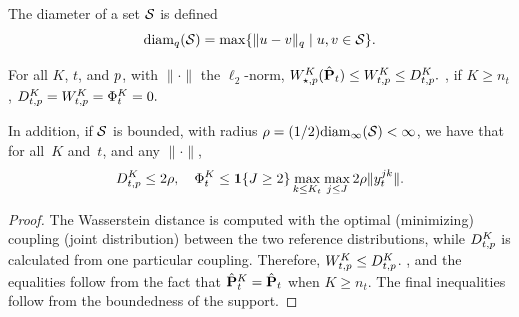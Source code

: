 \begin{definition}
    \label{def:diam_cluster}
    The diameter of a set $\mathcal{S}$ is defined
    $$\mathrm{diam}_q(\mathcal{S}) = \max\{\|u - v\|_q\mid u,v \in \mathcal{S}\}.$$
\end{definition}

\begin{proposition}
\label{prop:values}
For all $K$, $t$, and $p$, with $\|\cdot\|$ the $\ell_2$-norm,
    $W^K_{\star,p}(\hat{{\mathbf P}}_t) \leq  W^K_{t,p} \leq D^K_{t,p}.$ 
    , if $K \geq n_t$,
$D^K_{t,p}=W^K_{t,p}=\Phi^K_t = 0.$

In addition, if $\mathcal{S}$ is bounded, with radius $\rho = (1/2)\mathrm{diam}_\infty(\mathcal{S}) < \infty$, we have that for all~$K$ and~$t$, and any $\|\cdot\|$,
    $$ D^K_{t,p} \leq 2\rho,  \quad \Phi^K_t \leq  \mathbf 1\{J\geq2\}\max_{k\leq {K_t}}\max_{j\leq J}2\rho\|y^{jk}_t\|.$$
    
\end{proposition}
\begin{proof}
The Wasserstein distance is computed with the optimal (minimizing) coupling (joint distribution) between the two reference distributions, while $D^K_{t,p}$ is calculated from one particular coupling. Therefore, $W^K_{t,p} \leq D^K_{t,p}$. , and the equalities follow from  the fact that  $\hat{{\mathbf P}}^K_t = \hat{{\mathbf P}}_t$ when $K\geq n_t$.  The final inequalities follow from the boundedness of the support. 
\end{proof}

